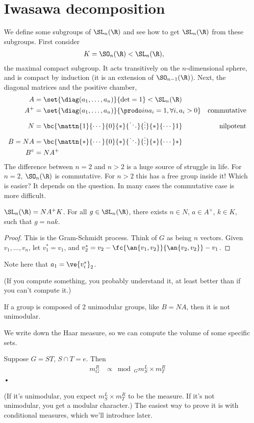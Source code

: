 \section{Iwasawa decomposition} 
We define some subgroups of $\SL_n(\R)$ and see how to get $\SL_n(\R)$ from these subgroups. First consider
\begin{align}
K&=\SO_n(\R)<\SL_n(\R),
\end{align}
the maximal compact subgroup.
It acts transitively on the $n$-dimensional sphere, and is compact by induction (it is an extension of $\SO_{n-1}(\R)$).
Next, the diagonal matrices and the positive chamber,
\begin{align}
A &= \set{\diag(a_1,\ldots, a_n)}{\det = 1}<\SL_n(\R)\\
A^+ &= \set{\diag(a_1,\ldots, a_n)}{\prodo in a_i = 1, \forall i, a_i>0}& \text{commutative}\\
N&= \bc{\mattn{1}{\cdots}{0}{*}{\ddots}{\vdots}{*}{\cdots}1} &\text{nilpotent}\\
B=NA &= \bc{\mattn{*}{\cdots}{0}{*}{\ddots}{\vdots}{*}{\cdots}*}\\
B^{\circ} &= NA^+
\end{align}
The difference between $n=2$ and $n>2$ is a huge source of struggle in life. For $n=2$, $\SO_n(\R)$ is commutative. For $n>2$ this has a free group inside it! Which is easier? It depends on the question. In many cases the commutative case is more difficult.

\begin{pr}
$\SL_n(\R)=NA^+K$. For all $g\in \SL_n(\R)$, there exists $n\in N$, $a\in A^+$, $k\in K$, such that $g = nak$.
\end{pr}
\begin{proof}
 This is the Gram-Schmidt process. Think of $G$ as being $n$ vectors. 
Given $v_1,\ldots, v_n$, let $v_1^*=v_1$, and $v_2^* = v_2 - \fc{\an{v_1,v_2}}{\an{v_2,v_2}} - v_1$. 
\end{proof}
Note here that $a_1 = \ve{v_i^*}_2$.

(If you compute something, you probably understand it, at least better than if you can't compute it.)

If a group is composed of 2 unimodular groups, like $B=NA$, then it is not unimodular. 

We write down the Haar measure, so we can compute the volume of some specific sets.
\begin{pr}
Suppose $G=ST$, $S\cap T=e$. Then 
\begin{align}
m_G^R &\propto \bmod_G m_S^L \times m_T^R
\end{align}•
\end{pr}
(If it's unimodular, you expect $m_S^L\times m_T^R$ to be the measure. If it's not unimodular, you get a modular character.)
The easiest way to prove it is with conditional measures, which we'll introduce later. 

